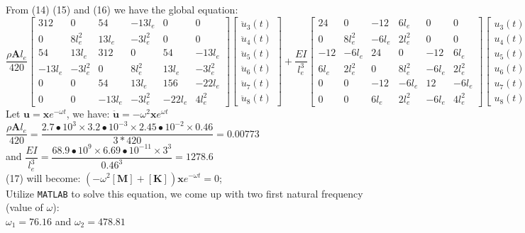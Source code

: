 \documentclass[14pt,a4paper]{article}
\begin{document}
\begin{enumerate}
	From (14) (15) and (16) we have the global equation:\\
	$\dfrac{\rho \textbf{A}l_e}{420} \begin{bmatrix} 312 & 0 & 54 & -13                                                                    l_e & 0 & 0\\ 0 & 8l_e^2 & 13l_e & -3l_e^2&0&0 \\ 54 & 13l_e & 312 & 0 & 54 & -13l_e \\ -13l_e & -3l_e^2 & 0 & 8l_e^2 & 13l_e & -3l_e^2 \\ 0&0& 54 & 13l_e & 156 & -22l_e \\ 0&0& -13l_e & -3l_e^2 & -22l_e & 4l_e^2  \end{bmatrix} \begin{bmatrix} \ddot{u}_3(t) \\ \ddot{u}_4(t) \\ \ddot{u}_5(t) \\ \ddot{u}_6(t) \\ \ddot{u}_7(t) \\ \ddot{u}_8(t) \end{bmatrix} + \dfrac{EI}{l_e^3} \begin{bmatrix} 24 & 0 & -12 & 6l_e &0&0 \\ 0 & 8l_e^2 & -6l_e & 2l_e^2 &0&0 \\ -12 & -6l_e & 24 & 0 & -12 & 6l_e \\ 6l_e & 2l_e^2 & 0 & 8l_e^2 & -6l_e & 2l_e^2 \\ 0&0& -12 & -6l_e & 12 & -6l_e \\ 0&0& 6l_e & 2l_e^2 & -6l_e & 4l_e^2 \end{bmatrix} \begin{bmatrix} u_3(t) \\ u_4(t) \\ u_5(t) \\ u_6(t) \\ u_7(t) \\ u_8(t) \end{bmatrix}$\\
	Let $\textbf{u} = \textbf{x}e^{-\omega t}$, we have: $\ddot{\textbf{u}} = -\omega^2\textbf{x}e^{\omega t}$\\
	$\dfrac{\rho \textbf{A}l_e}{420} = \dfrac{2.7\bullet10^3 \times 3.2\bullet10^{-3} \times 2.45\bullet 10^{-2} \times 0.46}{3*420} = 0.00773$  \\
	and $\dfrac{EI}{l_e^3} = \dfrac{68.9\bullet 10^9 \times 6.69\bullet10^{-11} \times 3^3}{0.46^3} = 1278.6  $\\
	(17) will become: $\left(-\omega^2[\textbf{M}] + [\textbf{K}]\right)\textbf{x}e^{-\omega t} = 0$;\\
	Utilize \texttt{MATLAB} to solve this equation, we come up with two first natural frequency (value of $\omega$):\\
	$\omega_1 = 76.16$ and $\omega_2 = 478.81$\\
	\pagebreak
	

\end{enumerate}
\end{document}
